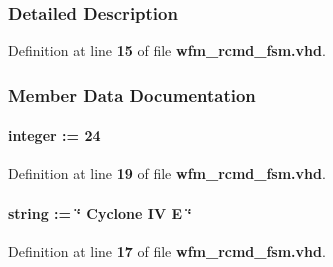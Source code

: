 \subsubsection{Detailed Description}


Definition at line {\bf 15} of file {\bf wfm\+\_\+rcmd\+\_\+fsm.\+vhd}.



\subsubsection{Member Data Documentation}
\paragraph[{addr\+\_\+size}]{ {\bfseries \textcolor{vhdlchar}{ }} {\bfseries \textcolor{comment}{integer}\textcolor{vhdlchar}{ }\textcolor{vhdlchar}{ }\textcolor{vhdlchar}{\+:}\textcolor{vhdlchar}{=}\textcolor{vhdlchar}{ }\textcolor{vhdlchar}{ } \textcolor{vhdldigit}{24} \textcolor{vhdlchar}{ }} \hspace{0.3cm}{\ttfamily [Generic]}}\label{classwfm__rcmd__fsm_aafb0d946e5259c516e95eed0224fc8e6}


Definition at line {\bf 19} of file {\bf wfm\+\_\+rcmd\+\_\+fsm.\+vhd}.

\paragraph[{dev\+\_\+family}]{ {\bfseries \textcolor{vhdlchar}{ }} {\bfseries \textcolor{comment}{string}\textcolor{vhdlchar}{ }\textcolor{vhdlchar}{ }\textcolor{vhdlchar}{\+:}\textcolor{vhdlchar}{=}\textcolor{vhdlchar}{ }\textcolor{vhdlchar}{ }\textcolor{vhdlchar}{ }\textcolor{vhdlchar}{ }\textcolor{keyword}{\char`\"{} Cyclone I\+V E \char`\"{}}\textcolor{vhdlchar}{ }} \hspace{0.3cm}{\ttfamily [Generic]}}\label{classwfm__rcmd__fsm_a1314572919959082d23e5f98e64a0ce2}


Definition at line {\bf 17} of file {\bf wfm\+\_\+rcmd\+\_\+fsm.\+vhd}.

